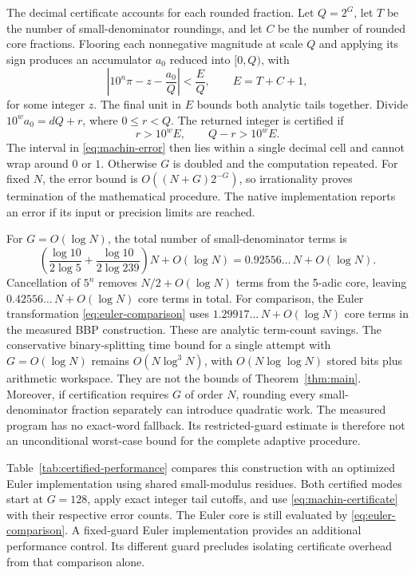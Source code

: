 \documentclass[11pt]{article}
\numberwithin{equation}{section}
\theoremstyle{definition}
\begin{document}
The decimal certificate accounts for each rounded fraction.
Let $Q=2^G$, let $T$ be the number of small-denominator roundings,
and let $C$ be the number of rounded core fractions. Flooring each
nonnegative magnitude at scale $Q$ and applying its sign produces
an accumulator $a_0$ reduced into $[0,Q)$, with
\begin{equation}\label{eq:machin-error}
 \left|10^n\pi-z-\frac{a_0}{Q}\right|<\frac{E}{Q},
 \qquad E=T+C+1,
\end{equation}
for some integer $z$. The final unit in $E$ bounds both analytic
tails together. Divide $10^w a_0=dQ+r$, where $0\le r<Q$.
The returned integer is certified if
\begin{equation}\label{eq:machin-certificate}
 r>10^w E,\qquad Q-r>10^w E.
\end{equation}
The interval in \eqref{eq:machin-error} then lies within a single
decimal cell and cannot wrap around $0$ or $1$. Otherwise $G$ is
doubled and the computation repeated. For fixed $N$, the error
bound is $O((N+G)2^{-G})$, so irrationality proves termination
of the mathematical procedure. The native implementation reports
an error if its input or precision limits are reached.

For $G=O(\log N)$, the total number of small-denominator terms is
\[
 \left(\frac{\log 10}{2\log 5}
       +\frac{\log 10}{2\log 239}\right)N+O(\log N)
 =0.92556\ldots\,N+O(\log N).
\]
Cancellation of $5^n$ removes $N/2+O(\log N)$ terms from the
5-adic core, leaving $0.42556\ldots\,N+O(\log N)$ core terms
in total. For comparison, the Euler transformation
\eqref{eq:euler-comparison} uses
$1.29917\ldots\,N+O(\log N)$ core terms in the measured
BBP construction. These are analytic term-count savings.
The conservative binary-splitting time bound for a single attempt
with $G=O(\log N)$ remains $O(N\log^3N)$, with
$O(N\log\log N)$ stored bits plus arithmetic workspace.
They are not the bounds of Theorem~\ref{thm:main}.
Moreover, if certification requires $G$ of order $N$,
rounding every small-denominator fraction separately can introduce
quadratic work. The measured program has no exact-word fallback.
Its restricted-guard estimate is therefore not an unconditional
worst-case bound for the complete adaptive procedure.

Table~\ref{tab:certified-performance} compares this construction
with an optimized Euler implementation using shared small-modulus
residues. Both certified modes start at $G=128$, apply exact
integer tail cutoffs, and use \eqref{eq:machin-certificate} with
their respective error counts. The Euler core is still evaluated
by \eqref{eq:euler-comparison}. A fixed-guard Euler implementation
provides an additional performance control. Its different guard
precludes isolating certificate overhead from that comparison alone.
\end{document}
